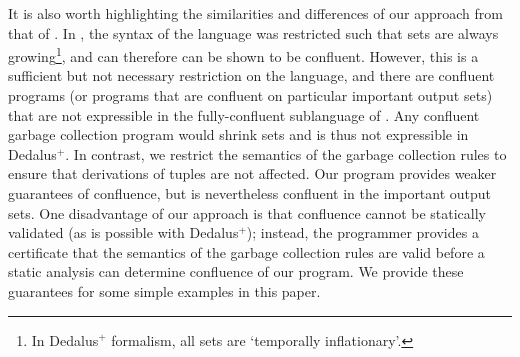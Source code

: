 It is also worth highlighting the similarities and differences of our approach from that of \cite{marczak2012confluence}.
In \cite{marczak2012confluence}, the syntax of the language was restricted such that sets are always growing\footnote{In Dedalus$^+$ formalism, all sets are `temporally inflationary'.}, and can therefore can be shown to be confluent.
However, this is a sufficient but not necessary restriction on the language, and there are confluent programs (or programs that are confluent on particular important output sets) that are not expressible in the fully-confluent sublanguage of \cite{marczak2012confluence}.
Any confluent garbage collection program would shrink sets and is thus not expressible in Dedalus$^+$.
In contrast, we restrict the semantics of the garbage collection rules to ensure that derivations of tuples are not affected. 
Our program provides weaker guarantees of confluence, but is nevertheless confluent in the important output sets.
One disadvantage of our approach is that confluence cannot be statically validated  (as is possible with Dedalus$^+$);
instead, the programmer provides a certificate that the semantics of the garbage collection rules are valid before a static analysis can determine confluence of our program.
We provide these guarantees for some simple examples in this paper.






